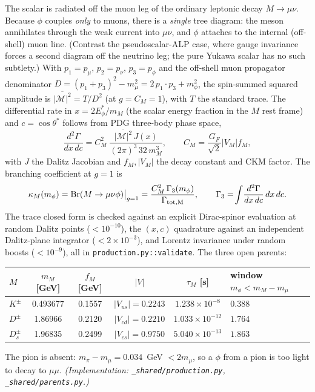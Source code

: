 \documentclass[11pt]{article}
\newcommand{\mphi}{m_\phi}
\newcommand{\Ma}{\mathcal{M}}
\begin{document}
The scalar is radiated off the muon leg of the ordinary leptonic decay
$M\to\mu\nu$. Because $\phi$ couples \emph{only} to muons, there is a
\emph{single} tree diagram: the meson annihilates through the weak current into
$\mu\nu$, and $\phi$ attaches to the internal (off-shell) muon line. (Contrast
the pseudoscalar-ALP case, where gauge invariance forces a second diagram off
the neutrino leg; the pure Yukawa scalar has no such subtlety.) With
$p_1=p_\mu,\,p_2=p_\nu,\,p_3=p_\phi$ and the off-shell muon propagator
denominator $D=(p_1+p_3)^2-m_\mu^2=2\,p_1\!\cdot p_3+\mphi^2$, the spin-summed
squared amplitude is $\overline{|\Ma|^2}=T/D^2$ (at $g=C_M=1$), with $T$ the
standard trace. The differential rate in $x=2E_\phi^*/m_M$ (the scalar energy
fraction in the $M$ rest frame) and $c=\cos\theta^*$ follows from PDG three-body
phase space,
\begin{equation}
\frac{d^2\Gamma}{dx\,dc}
= C_M^2\;\frac{\overline{|\Ma|^2}\,J(x)}{(2\pi)^3\,32\,m_M^3},
\qquad C_M = \frac{G_F}{\sqrt2}|V_{M}|f_M ,
\label{eq:me}
\end{equation}
with $J$ the Dalitz Jacobian and $f_M,|V_M|$ the decay constant and CKM factor.
The branching coefficient at $g=1$ is
\begin{equation}
\kappa_M(\mphi) = \mathrm{Br}(M\to\mu\nu\phi)\big|_{g=1}
= \frac{C_M^2\,\Gamma_3(\mphi)}{\Gamma_{\rm tot,M}},\qquad
\Gamma_3=\!\int\! \frac{d^2\Gamma}{dx\,dc}\,dx\,dc .
\label{eq:kappa}
\end{equation}
The trace closed form is checked against an explicit Dirac-spinor evaluation at
random Dalitz points ($<10^{-10}$), the $(x,c)$ quadrature against an independent
Dalitz-plane integrator ($<2\times10^{-3}$), and Lorentz invariance under random
boosts ($<10^{-9}$), all in \texttt{production.py::validate}. The three open
parents:
\begin{center}\footnotesize
\begin{tabular}{lccccl}
\toprule
$M$ & $m_M$ [GeV] & $f_M$ [GeV] & $|V|$ & $\tau_M$ [s] & window $\mphi<m_M-m_\mu$\\
\midrule
$K^\pm$  & 0.493677 & 0.1557 & $|V_{us}|{=}0.2243$ & $1.238\times10^{-8}$ & $0.388$ \\
$D^\pm$  & 1.86966  & 0.2120 & $|V_{cd}|{=}0.2210$ & $1.033\times10^{-12}$ & $1.764$ \\
$D_s^\pm$& 1.96835  & 0.2499 & $|V_{cs}|{=}0.9750$ & $5.040\times10^{-13}$ & $1.863$ \\
\bottomrule
\end{tabular}
\end{center}
The pion is absent: $m_\pi-m_\mu=0.034$~GeV $<2m_\mu$, so a $\phi$ from a pion is
too light to decay to $\mu\mu$. \emph{(Implementation:
\texttt{\_shared/production.py}, \texttt{\_shared/parents.py}.)}
\end{document}
